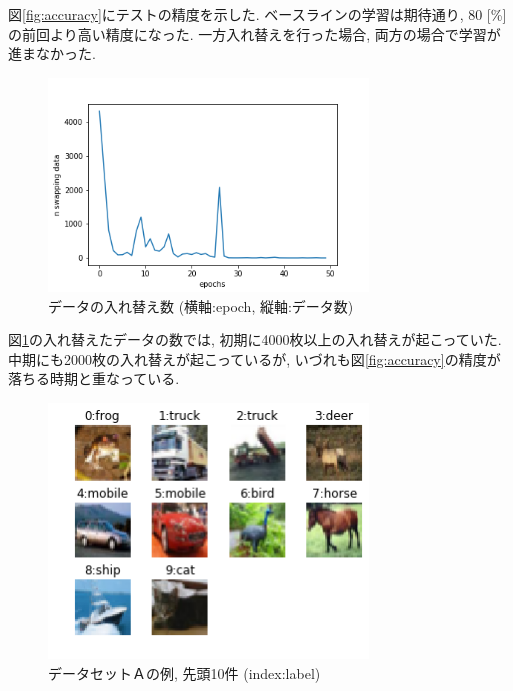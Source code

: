 \documentclass[twocolumn]{jarticle}     %
\begin{document}
図\ref{fig:accuracy}にテストの精度を示した.
ベースラインの学習は期待通り, 80 [\%]の前回より高い精度になった.
一方入れ替えを行った場合, 両方の場合で学習が進まなかった.

\begin{figure}[tb]
	\begin{center}
		\includegraphics[clip,width=8.5cm]{swapdata.png}
		\caption{データの入れ替え数 (横軸:epoch, 縦軸:データ数)}
		\label{fig:swapdata}
	\end{center}
\end{figure}

図\ref{fig:swapdata}の入れ替えたデータの数では, 初期に4000枚以上の入れ替えが起こっていた. 中期にも2000枚の入れ替えが起こっているが, いづれも図\ref{fig:accuracy}の精度が落ちる時期と重なっている.

\begin{figure}[tb]
	\begin{center}
		\includegraphics[clip,width=8.5cm]{dataimage.png}
		\caption{データセットＡの例, 先頭10件 (index:label)}
		\label{fig:dataimage}
	\end{center}
\end{figure}
\end{document}
